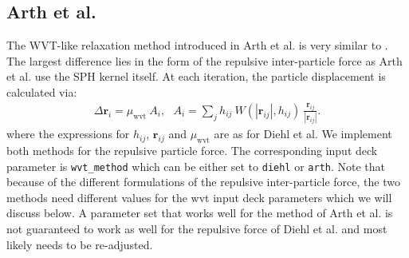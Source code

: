 \documentclass{article}
\begin{document}
\subsection{Arth et al.}
The WVT-like relaxation method introduced in Arth et al. \cite{Arth19} is very similar to \cite{Diehl15}. 
The largest difference lies in the form of the repulsive inter-particle force as Arth et al. use the SPH kernel itself. 
At each iteration, the particle displacement is calculated via:
\begin{align}
\Delta \mathbf{r}_i = \mu_\mathrm{wvt} \: A_i, \:\:\: A_i = \sum_j h_{ij} \: W(|\mathbf{r}_{ij}|, h_{ij})  \: \frac{\mathbf{r}_{ij}}{|\mathbf{r}_{ij}|}.
\label{arth_deltax}
\end{align}
where the expressions for $h_{ij}$, $\mathbf{r}_{ij}$ and $ \mu_\mathrm{wvt}$ are as for Diehl et al.
We implement both methods for the repulsive particle force. 
The corresponding input deck parameter is \texttt{wvt\_method} which can be either set to \texttt{diehl} or \texttt{arth}. 
Note that because of the different formulations of the repulsive inter-particle force, the two methods need different values for the wvt input deck parameters which we will discuss below. 
A parameter set that works well for the method of Arth et al. is not guaranteed to work as well for the repulsive force of Diehl et al. and most likely needs to be re-adjusted. 
\end{document}
